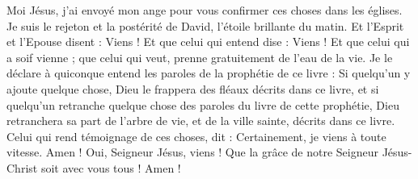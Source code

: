 \begin{multicols}{2}
Moi Jésus, j'ai envoyé mon ange pour vous confirmer ces choses dans les églises. Je suis le rejeton et la postérité de David, l'étoile brillante du matin.
Et l'Esprit et l'Epouse disent : Viens ! Et que celui qui entend dise : Viens ! Et que celui qui a soif vienne ; que celui qui veut, prenne gratuitement de l'eau de la vie.
Je le déclare à quiconque entend les paroles de la prophétie de ce livre : Si quelqu'un y ajoute quelque chose, Dieu le frappera des fléaux décrits dans ce livre,
et si quelqu'un retranche quelque chose des paroles du livre de cette prophétie, Dieu retranchera sa part de l'arbre de vie, et de la ville sainte, décrits dans ce livre.
Celui qui rend témoignage de ces choses, dit : Certainement, je viens à toute vitesse. Amen ! Oui, Seigneur Jésus, viens !
Que la grâce de notre Seigneur Jésus-Christ soit avec vous tous ! Amen !
\PPE{}
\end{multicols}
